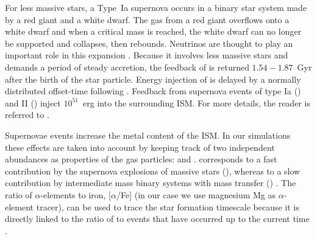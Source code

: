 For less massive stars, a Type~Ia supernova occurs in a binary star system made by a red giant and a white dwarf.
The gas from a red giant overflows onto a white dwarf and when a critical mass is reached, the white dwarf can no longer be supported and collapses, then rebounds. Neutrinos are thought to play an important role in this expansion \citep{Wongwathanarat2017}.
Because it involves less massive stars and demands a period of steady accretion, the feedback of \snia{} is returned $1.54 − 1.87$~Gyr after the birth of the star particle.
Energy injection of \snia{} is delayed by a normally distributed offset-time following \citet{Strolger2004}.
Feedback from supernova events of type Ia (\snia) and II (\snii) inject $10^{51}$~erg into the surrounding ISM. For more details, the reader is referred to \cite{Valcke2008}.


Supernovae events increase the metal content of the ISM. %
In our simulations these effects are taken into account by keeping track of two independent abundances as properties of the gas particles: \mgfe{} and \feh{}.
\mgfe{} corresponds to a fast contribution by the supernova explosions of massive stars (\snii{}), whereas \feh{} to a slow contribution by  intermediate mass binary systems with mass transfer (\snia{}) \citep{DeRijcke2013}.
The ratio of $\alpha$-elements to iron, [$\alpha$/Fe] (in our case we use magnesium Mg as $\alpha$-element tracer), can be used to trace the star formation timescale because it is directly linked to the ratio of \snii{} to \snia{} events that have occurred up to the current time \citep{Tolstoy2009}.



